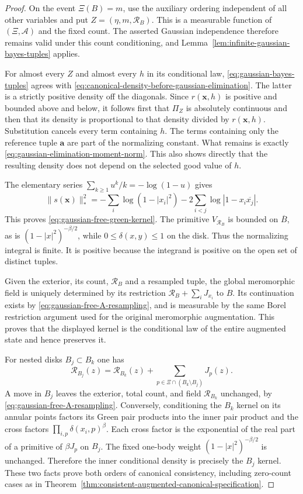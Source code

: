 \documentclass[11pt,a4paper]{article}
\numberwithin{equation}{section}
\theoremstyle{definition}
\theoremstyle{remark}
\begin{document}
\begin{proof}
On the event $\Xi(B)=m$, use the auxiliary ordering independent of
all other variables and put
$Z=(\eta,m,\mathcal R_B)$. This is a measurable function of
$(\Xi,\mathcal A)$ and the fixed count. The asserted Gaussian
independence therefore remains valid under this count conditioning,
and Lemma~\ref{lem:infinite-gaussian-bayes-tuples} applies.

For almost every $Z$ and almost every $h$ in its conditional law,
\eqref{eq:gaussian-bayes-tuples} agrees with
\eqref{eq:canonical-density-before-gaussian-elimination}. The latter
is a strictly positive density off the diagonals. Since
$r(\mathbf x,h)$ is positive and bounded above and below, it follows
first that $\Pi_Z$ is absolutely continuous and then that its density
is proportional to that density divided by
$r(\mathbf x,h)$. Substitution cancels every term containing $h$.
The terms containing only the reference tuple $\mathbf a$ are part
of the normalizing constant. What remains is exactly
\eqref{eq:gaussian-elimination-moment-norm}. This also shows directly
that the resulting density does not depend on the selected good value
of $h$.

The elementary series $\sum_{k\ge1}u^k/k=-\log(1-u)$ gives
\[
 \|s(\mathbf x)\|_*^2
 =-\sum_i\log(1-|x_i|^2)
                   -2\sum_{i<j}\log|1-x_i\overline{x_j}|.
\]
This proves \eqref{eq:gaussian-free-green-kernel}. The primitive
$V_{\mathcal R_B}$ is bounded on $\overline B$, as is
$(1-|x|^2)^{-\beta/2}$, while $0\le\delta(x,y)\le1$ on the disk.
Thus the normalizing integral is finite. It is positive because the
integrand is positive on the open set of distinct tuples.

Given the exterior, its count, $\mathcal R_B$ and a resampled tuple,
the global meromorphic field is uniquely determined by its restriction
$\mathcal R_B+\sum_iJ_{x_i}$ to $B$. Its continuation exists by
\eqref{eq:gaussian-free-A-resampling}, and is measurable by the same
Borel restriction argument used for the original meromorphic
augmentation. This proves that the displayed kernel is the
conditional law of the entire augmented state and hence preserves it.

For nested disks $B_j\subset B_k$ one has
\[
 \mathcal R_{B_j}(z)=\mathcal R_{B_k}(z)
                     +\sum_{p\in\Xi\cap(B_k\setminus B_j)}J_p(z).
\]
A move in $B_j$ leaves the exterior, total count, and field
$\mathcal R_{B_k}$ unchanged, by
\eqref{eq:gaussian-free-A-resampling}. Conversely, conditioning the
$B_k$ kernel on its annular points factors its Green pair products
into the inner pair product and the cross factors
$\prod_{i,p}\delta(x_i,p)^\beta$. Each cross factor is the exponential
of the real part of a primitive of $\beta J_p$ on $B_j$.
The fixed one-body weight $(1-|x|^2)^{-\beta/2}$ is unchanged.
Therefore the inner conditional density is precisely the $B_j$
kernel. These two facts prove both orders of canonical consistency,
including zero-count cases as in
Theorem~\ref{thm:consistent-augmented-canonical-specification}.
\end{proof}
\end{document}
